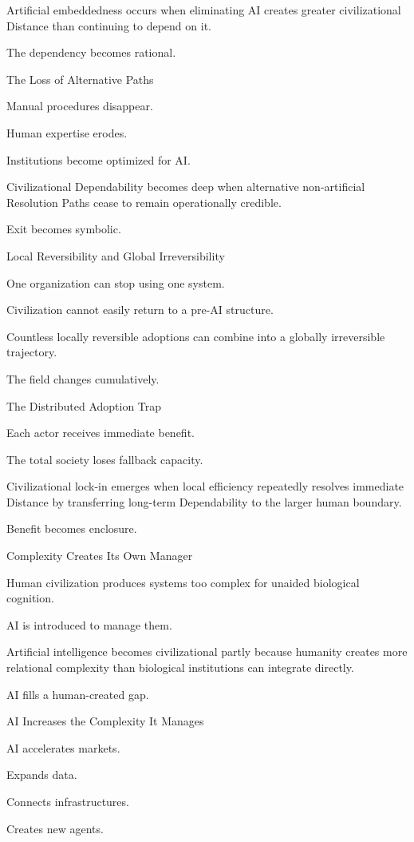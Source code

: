 Artificial embeddedness occurs when eliminating AI creates greater civilizational Distance than continuing to depend on it.

The dependency becomes rational.

The Loss of Alternative Paths

Manual procedures disappear.

Human expertise erodes.

Institutions become optimized for AI.

Civilizational Dependability becomes deep when alternative non-artificial Resolution Paths cease to remain operationally credible.

Exit becomes symbolic.

Local Reversibility and Global Irreversibility

One organization can stop using one system.

Civilization cannot easily return to a pre-AI structure.

Countless locally reversible adoptions can combine into a globally irreversible trajectory.

The field changes cumulatively.

The Distributed Adoption Trap

Each actor receives immediate benefit.

The total society loses fallback capacity.

Civilizational lock-in emerges when local efficiency repeatedly resolves immediate Distance by transferring long-term Dependability to the larger human boundary.

Benefit becomes enclosure.

Complexity Creates Its Own Manager

Human civilization produces systems too complex for unaided biological cognition.

AI is introduced to manage them.

Artificial intelligence becomes civilizational partly because humanity creates more relational complexity than biological institutions can integrate directly.

AI fills a human-created gap.

AI Increases the Complexity It Manages

AI accelerates markets.

Expands data.

Connects infrastructures.

Creates new agents.


